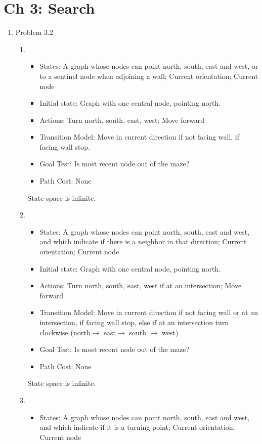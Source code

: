 \documentclass[10pt]{article}
\begin{document}
\section*{Ch 3: Search}
\begin{enumerate}
\item Problem 3.2 
  \begin{enumerate}
  \item
    \begin{itemize}
    \item States: A graph whose nodes can point north, south, east and
      west, or to a sentinel node when adjoining a wall; Current orientation; Current node
    \item Initial state: Graph with one central node, pointing north.
    \item Actions: Turn north, south, east, west; Move forward
    \item Transition Model: Move in current direction if not facing wall, if facing wall stop.
    \item Goal Test: Is most recent node out of the maze?
    \item Path Cost: None
    \end{itemize}  
State space is infinite.
  \item
    \begin{itemize}
    \item States: A graph whose nodes can point north, south, east and
      west, and which indicate if there is a neighbor in that direction; Current orientation; Current node
    \item Initial state: Graph with one central node, pointing north.
    \item Actions: Turn north, south, east, west if at an intersection; Move forward
    \item Transition Model: Move in current direction if not facing wall or at an intersection, if facing wall stop, else if at an intersection turn clockwise (north$\rightarrow$ east$\rightarrow$ south 
$\rightarrow$ west)
    \item Goal Test: Is most recent node out of the maze?
    \item Path Cost: None
    \end{itemize}
    State space is infinite.
  \item
    \begin{itemize}
    \item States: A graph whose nodes can point north, south, east and
      west, and which indicate if it is a turning point; Current orientation; Current node

\end{itemize}
\end{enumerate}
\end{enumerate}
\end{document}
